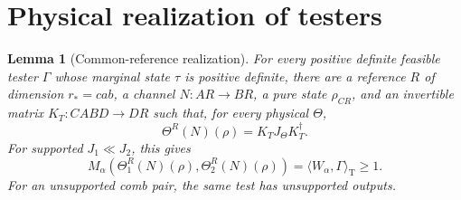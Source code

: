 \documentclass[11pt]{article}
\newcommand{\M}{M_\alpha}
\newcommand{\pair}[2]{\langle #1,#2\rangle_{\mathrm T}}
\newtheorem{lemma}[theorem]{Lemma}
\theoremstyle{remark}
\begin{document}
\section{Physical realization of testers}
\begin{lemma}[Common-reference realization]\label{lem:realize}
For every positive definite feasible tester $\Gamma$ whose marginal state
$\tau$ is positive definite, there are a reference $R$ of dimension
$r_*=cab$, a channel $N:AR\to BR$, a pure state $\rho_{CR}$, and an invertible
matrix $K_T:CABD\to DR$ such that, for every physical $\Theta$,
\begin{equation}\label{eq:realizedoutput}
 \Theta^R(N)(\rho)=K_TJ_\Theta K_T^\dagger.
\end{equation}
For supported $J_1\ll J_2$, this gives
\begin{equation}\label{eq:realizedmoment}
 \M(\Theta_1^R(N)(\rho),\Theta_2^R(N)(\rho))
             =\pair{W_\alpha}{\Gamma}\geq1.
\end{equation}
For an unsupported comb pair, the same test has unsupported outputs.
\end{lemma}
\end{document}

